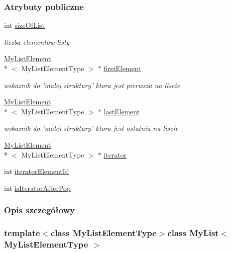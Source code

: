 \subsubsection*{Atrybuty publiczne}
\begin{DoxyCompactItemize}
\item 
int \hyperlink{class_my_list_a5a3a323664c97313be3a8d0b36866c3f}{size\-Of\-List}
\begin{DoxyCompactList}\small\item\em liczba elementow listy \end{DoxyCompactList}\item 
\hyperlink{class_my_list_element}{My\-List\-Element}\\*
$<$ My\-List\-Element\-Type $>$ $\ast$ \hyperlink{class_my_list_a15131c9e2f10a393a916c64e901a1290}{first\-Element}
\begin{DoxyCompactList}\small\item\em wskaznik do 'malej struktury' ktora jest pierwsza na liscie \end{DoxyCompactList}\item 
\hyperlink{class_my_list_element}{My\-List\-Element}\\*
$<$ My\-List\-Element\-Type $>$ $\ast$ \hyperlink{class_my_list_a70831dde3a7f24c7d3dd5b30980e8c27}{last\-Element}
\begin{DoxyCompactList}\small\item\em wskaznik do 'malej struktury' ktora jest ostatnia na liscie \end{DoxyCompactList}\item 
\hyperlink{class_my_list_element}{My\-List\-Element}\\*
$<$ My\-List\-Element\-Type $>$ $\ast$ \hyperlink{class_my_list_aecf059ed6926a3d6eb82641d46a3e3ff}{iterator}
\item 
int \hyperlink{class_my_list_ad27795091bcc0c321d81c2196bc1cbb0}{iterator\-Element\-Id}
\item 
int \hyperlink{class_my_list_a1041f18464ae98367844d13aa2e7b5a6}{is\-Iterator\-After\-Pop}
\end{DoxyCompactItemize}


\subsubsection{Opis szczegółowy}
\subsubsection*{template$<$class My\-List\-Element\-Type$>$class My\-List$<$ My\-List\-Element\-Type $>$}

